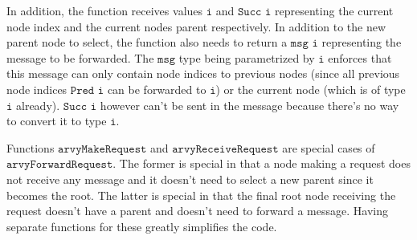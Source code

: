 \documentclass[a4paper, oneside]{discothesis}
\begin{document}
In addition, the function receives values $\texttt{i}$ and $\texttt{Succ i}$ representing the current node index and the current nodes parent respectively. In addition to the new parent node to select, the function also needs to return a $\texttt{msg i}$ representing the message to be forwarded. The $\texttt{msg}$ type being parametrized by $\texttt{i}$ enforces that this message can only contain node indices to previous nodes (since all previous node indices $\texttt{Pred i}$ can be forwarded to $\texttt{i}$) or the current node (which is of type $\texttt{i}$ already). $\texttt{Succ i}$ however can't be sent in the message because there's no way to convert it to type $\texttt{i}$.

Functions $\texttt{arvyMakeRequest}$ and $\texttt{arvyReceiveRequest}$ are special cases of $\texttt{arvyForwardRequest}$. The former is special in that a node making a request does not receive any message and it doesn't need to select a new parent since it becomes the root. The latter is special in that the final root node receiving the request doesn't have a parent and doesn't need to forward a message. Having separate functions for these greatly simplifies the code.
\end{document}
